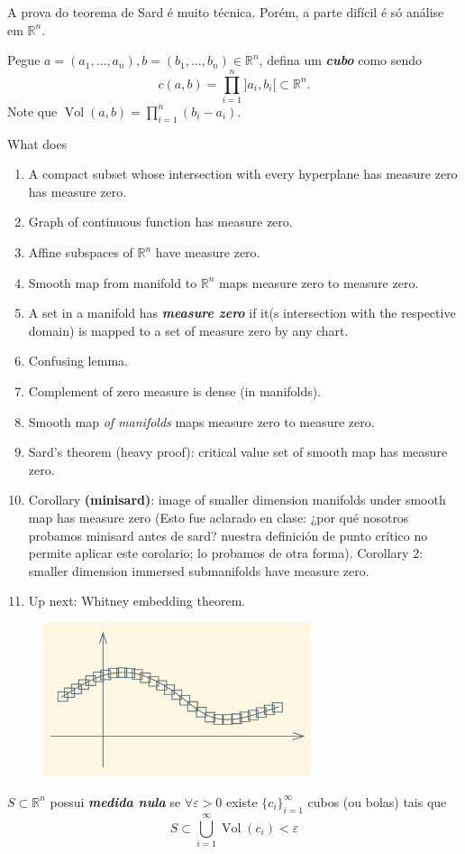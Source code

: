 A prova do teorema de Sard é muito técnica. Porém, a parte difícil é só análise em \(\mathbb{R}^n\).

Pegue \(a=(a_1,\ldots,a_n),b=(b_1,\ldots,b_n) \in \mathbb{R}^n\), defina um \textit{\textbf{cubo}} como sendo
\[c(a,b)=\prod_{i=1}^n ]a_i,b_i[ \subset \mathbb{R}^n.\]
Note que \(\operatorname{Vol}(a,b)=\prod_{i=1}^n(b_i-a_i).\)

\begin{thing5}{What \cite{lee} does}\leavevmode
\begin{enumerate}
\item A compact subset whose intersection with every hyperplane has measure zero has measure zero.
\item Graph of continuous function has measure zero.
\item Affine subspaces of \(\mathbb{R}^n\) have measure zero.
\item Smooth map from manifold to \(\mathbb{R}^n\) maps measure zero to measure zero.
\item A set in a manifold has \textit{\textbf{measure zero}} if it(s intersection with the respective domain) is mapped to a set of measure zero by any chart.
\item Confusing lemma.
\item Complement of zero measure is dense (in manifolds).
\item Smooth map \textit{of manifolds} maps measure zero to measure zero.
\item Sard's theorem (heavy proof): critical value set of smooth map has measure zero.
\item Corollary \textbf{(minisard)}: image of smaller dimension manifolds under smooth map has measure zero {\color{6}(Esto fue aclarado en clase: ¿por qué nosotros probamos minisard antes de sard? nuestra definición de punto crítico no permite aplicar este corolario; lo probamos de otra forma)}. Corollary 2: smaller dimension immersed submanifolds have measure zero.
\item Up next: Whitney embedding theorem.
\end{enumerate}
\end{thing5}

\begin{defn}\leavevmode
	\begin{figure}[H]
		\centering
		\includegraphics[width=0.7\textwidth]{fig1}
	\end{figure}
\(S \subset \mathbb{R}^n\) possui \textit{\textbf{medida nula}} se \(\forall  \varepsilon >0\) existe \(\{c_i\}_{i=1}^\infty\) cubos (ou bolas) tais que \[S \subset \bigcup_{i=1}^\infty \operatorname{Vol}(c_i)<\varepsilon\]
\end{defn}

